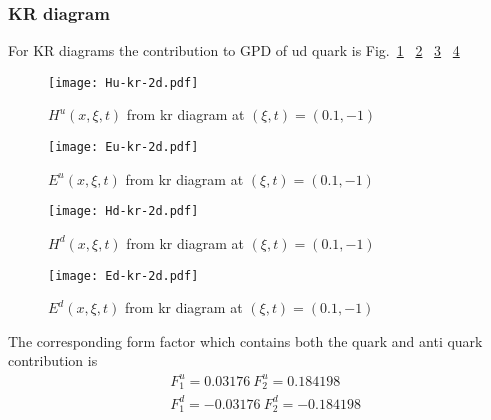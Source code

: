 \documentclass[preprintnumbers,prd,superscriptaddress,preprint]{revtex4-1}
\begin{document}
	\subsubsection{KR diagram}
	For KR diagrams the contribution to GPD of ud quark is Fig.~\ref{Hu-kr} ~\ref{Eu-kr}  ~\ref{Hd-kr} ~\ref{Ed-kr}  
	\begin{figure}[h]
		\begin{center}
			\texttt{[image: Hu-kr-2d.pdf]}
			\caption{$H^{u}(x,\xi,t)$ from kr diagram at $(\xi,t)=(0.1,-1)$} 
			\label{Hu-kr}
		\end{center}
	\end{figure}
	\begin{figure}[h]
		\begin{center}
			\texttt{[image: Eu-kr-2d.pdf]}
			\caption{$E^{u}(x,\xi,t)$ from kr diagram at $(\xi,t)=(0.1,-1)$} 
			\label{Eu-kr}
		\end{center}
	\end{figure}  
	\begin{figure}[h]
		\begin{center}
			\texttt{[image: Hd-kr-2d.pdf]}
			\caption{$H^{d}(x,\xi,t)$ from kr diagram at $(\xi,t)=(0.1,-1)$} 
			\label{Hd-kr}
		\end{center}
	\end{figure}
	\begin{figure}[h]
		\begin{center}
			\texttt{[image: Ed-kr-2d.pdf]}
			\caption{$E^{d}(x,\xi,t)$ from kr diagram at $(\xi,t)=(0.1,-1)$} 
			\label{Ed-kr}
		\end{center}
	\end{figure}  
	The corresponding form factor which contains both the quark and anti quark contribution is 
	\begin{align}
		& F^{u}_{1}=0.03176  \ F^{u}_{2}=0.184198 \\
		& F^{d}_{1}= -0.03176\ F^{d}_{2}=-0.184198
	\end{align}
\end{document}
